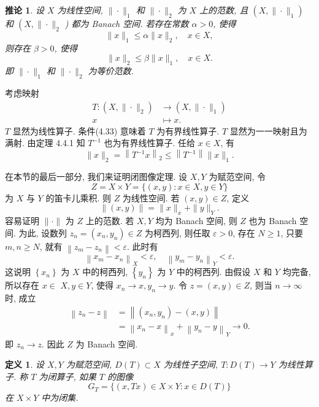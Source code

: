 \documentclass[openany]{ctexbook}
\makeatletter
\theoremstyle{kaiti}
\newtheorem{definition}{定义}[section]
\newtheorem{corollary}{推论}[section]
\theoremstyle{normal}
\renewenvironment{proof}[1][\proofname]{\par
    \pushQED{\qed}%
    \normalfont \topsep6\p@\@plus6\p@\relax
    \trivlist
    \item\relax
    {\heiti #1}\hspace{2\labelsep}\ignorespaces
  }{%
    \popQED\endtrivlist\@endpefalse
  }
\makeatother
\begin{document}
\begin{corollary}
设 $X$ 为线性空间, $\|\cdot\|_1$ 和 $\|\cdot\|_2$ 为 $X$ 上的范数, 且 $\left(X,\|\cdot\|_1\right)$ 和 $\left(X,\|\cdot\|_2\right.$ ) 都为 Banach 空间. 若存在常数 $\alpha>0$, 使得
\begin{equation}
  \|x\|_1 \leqslant \alpha\|x\|_2, \quad x \in X,
\end{equation}
则存在 $\beta>0$, 使得
$$
\|x\|_2 \leqslant \beta\|x\|_1, \quad x \in X.
$$
即 $\|\cdot\|_1$ 和 $\|\cdot\|_2$ 为等价范数.
\end{corollary}

\begin{proof}
考虑映射
$$
\begin{aligned}
T:\left(X,\|\cdot\|_2\right) & \rightarrow\left(X,\|\cdot\|_1\right) \\
x & \mapsto x.
\end{aligned}
$$
$T$ 显然为线性算子. 条件(4.33) 意味着 $T$ 为有界线性算子. $T$ 显然为一一映射且为满射. 由定理 4.4.1 知 $T^{-1}$ 也为有界线性算子. 任给 $x \in X$, 有
$$
\|x\|_2=\left\|T^{-1} x\right\|_2 \leqslant\left\|T^{-1}\right\|\|x\|_1.
$$
\end{proof}

在本节的最后一部分, 我们来证明闭图像定理. 设 $X, Y$ 为赋范空间, 令
$$
Z=X \times Y=\{(x, y): x \in X, y \in Y\}
$$
为 $X$ 与 $Y$ 的笛卡儿乘积. 则 $Z$ 为线性空间. 若 $(x, y) \in Z$, 定义
$$
\|(x, y)\|=\|x\|_{x}+\|y\|_{Y}.
$$
容易证明 $\|\cdot\|$ 为 $Z$ 上的范数. 若 $X, Y$ 均为 Banach 空间, 则 $Z$ 也为 Banach 空间. 为此, 设数列 $z_n=\left(x_n, y_n\right) \in Z$ 为柯西列, 则任取 $\varepsilon>0$, 存在 $N \geqslant 1$, 只要 $m, n \geqslant N$, 就有 $\left\|z_m-z_n\right\|<\varepsilon$. 此时有
$$
\left\|x_m-x_n\right\|_{X}<\varepsilon, \quad\left\|y_m-y_n\right\|_{Y}<\varepsilon.
$$
这说明 $\left\{x_n\right\}$ 为 $X$ 中的柯西列, $\left\{y_n\right\}$ 为 $Y$ 中的柯西列. 由假设 $X$ 和 $Y$ 均完备, 所以存在 $x \in$ $X, y \in Y$, 使得 $x_n \rightarrow x, y_n \rightarrow y$. 令 $z=(x, y) \in Z$, 则当 $n \rightarrow \infty$ 时, 成立
$$
\begin{aligned}
\left\|z_n-z\right\| &=\left\|\left(x_n, y_n\right)-(x, y)\right\| \\
&=\left\|x_n-x\right\|_{x}+\left\|y_n-y\right\|_{Y} \rightarrow 0.
\end{aligned}
$$
即 $z_n \rightarrow z$. 因此 $Z$ 为 Banach 空间.

\begin{definition}
设 $X, Y$ 为赋范空间, $D(T) \subset X$ 为线性子空间, $T: D(T) \rightarrow Y$ 为线性算子. 称 $T$ 为闭算子, 如果 $T$ 的图像
$$
G_{T}=\{(x, T x) \in X \times Y: x \in D(T)\}
$$
在 $X \times Y$ 中为闭集.
\end{definition}
\end{document}
